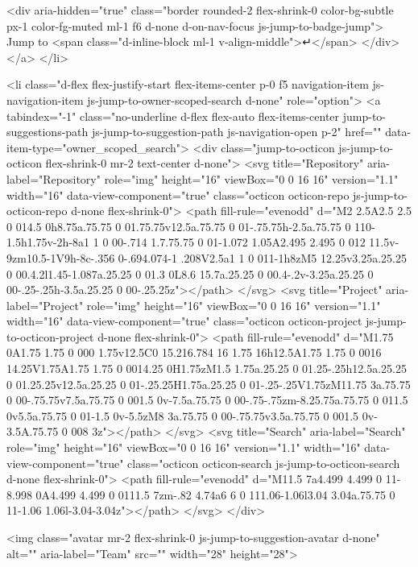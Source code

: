     <div aria-hidden="true" class="border rounded-2 flex-shrink-0 color-bg-subtle px-1 color-fg-muted ml-1 f6 d-none d-on-nav-focus js-jump-to-badge-jump">
      Jump to
      <span class="d-inline-block ml-1 v-align-middle">↵</span>
    </div>
  </a>
</li>

  

<li class="d-flex flex-justify-start flex-items-center p-0 f5 navigation-item js-navigation-item js-jump-to-owner-scoped-search d-none" role="option">
  <a tabindex="-1" class="no-underline d-flex flex-auto flex-items-center jump-to-suggestions-path js-jump-to-suggestion-path js-navigation-open p-2" href="" data-item-type="owner_scoped_search">
    <div class="jump-to-octicon js-jump-to-octicon flex-shrink-0 mr-2 text-center d-none">
      <svg title="Repository" aria-label="Repository" role="img" height="16" viewBox="0 0 16 16" version="1.1" width="16" data-view-component="true" class="octicon octicon-repo js-jump-to-octicon-repo d-none flex-shrink-0">
    <path fill-rule="evenodd" d="M2 2.5A2.5 2.5 0 014.5 0h8.75a.75.75 0 01.75.75v12.5a.75.75 0 01-.75.75h-2.5a.75.75 0 110-1.5h1.75v-2h-8a1 1 0 00-.714 1.7.75.75 0 01-1.072 1.05A2.495 2.495 0 012 11.5v-9zm10.5-1V9h-8c-.356 0-.694.074-1 .208V2.5a1 1 0 011-1h8zM5 12.25v3.25a.25.25 0 00.4.2l1.45-1.087a.25.25 0 01.3 0L8.6 15.7a.25.25 0 00.4-.2v-3.25a.25.25 0 00-.25-.25h-3.5a.25.25 0 00-.25.25z"></path>
</svg>
      <svg title="Project" aria-label="Project" role="img" height="16" viewBox="0 0 16 16" version="1.1" width="16" data-view-component="true" class="octicon octicon-project js-jump-to-octicon-project d-none flex-shrink-0">
    <path fill-rule="evenodd" d="M1.75 0A1.75 1.75 0 000 1.75v12.5C0 15.216.784 16 1.75 16h12.5A1.75 1.75 0 0016 14.25V1.75A1.75 1.75 0 0014.25 0H1.75zM1.5 1.75a.25.25 0 01.25-.25h12.5a.25.25 0 01.25.25v12.5a.25.25 0 01-.25.25H1.75a.25.25 0 01-.25-.25V1.75zM11.75 3a.75.75 0 00-.75.75v7.5a.75.75 0 001.5 0v-7.5a.75.75 0 00-.75-.75zm-8.25.75a.75.75 0 011.5 0v5.5a.75.75 0 01-1.5 0v-5.5zM8 3a.75.75 0 00-.75.75v3.5a.75.75 0 001.5 0v-3.5A.75.75 0 008 3z"></path>
</svg>
      <svg title="Search" aria-label="Search" role="img" height="16" viewBox="0 0 16 16" version="1.1" width="16" data-view-component="true" class="octicon octicon-search js-jump-to-octicon-search d-none flex-shrink-0">
    <path fill-rule="evenodd" d="M11.5 7a4.499 4.499 0 11-8.998 0A4.499 4.499 0 0111.5 7zm-.82 4.74a6 6 0 111.06-1.06l3.04 3.04a.75.75 0 11-1.06 1.06l-3.04-3.04z"></path>
</svg>
    </div>

    <img class="avatar mr-2 flex-shrink-0 js-jump-to-suggestion-avatar d-none" alt="" aria-label="Team" src="" width="28" height="28">

